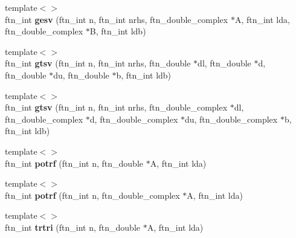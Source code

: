 \begin{DoxyCompactItemize}
\item 
\hypertarget{classsddk_1_1linalg_3_01_c_p_u_01_4_ab236040253d4ec5136b91ff0136cb5e0}{}{\footnotesize template$<$$>$ }\\ftn\+\_\+int {\bfseries gesv} (ftn\+\_\+int n, ftn\+\_\+int nrhs, ftn\+\_\+double\+\_\+complex $\ast$A, ftn\+\_\+int lda, ftn\+\_\+double\+\_\+complex $\ast$B, ftn\+\_\+int ldb)\label{classsddk_1_1linalg_3_01_c_p_u_01_4_ab236040253d4ec5136b91ff0136cb5e0}

\item 
\hypertarget{classsddk_1_1linalg_3_01_c_p_u_01_4_a7697a33f551389b3bca7d1939eb3e57a}{}{\footnotesize template$<$$>$ }\\ftn\+\_\+int {\bfseries gtsv} (ftn\+\_\+int n, ftn\+\_\+int nrhs, ftn\+\_\+double $\ast$dl, ftn\+\_\+double $\ast$d, ftn\+\_\+double $\ast$du, ftn\+\_\+double $\ast$b, ftn\+\_\+int ldb)\label{classsddk_1_1linalg_3_01_c_p_u_01_4_a7697a33f551389b3bca7d1939eb3e57a}

\item 
\hypertarget{classsddk_1_1linalg_3_01_c_p_u_01_4_a2227300a3adde5e0fcbc7c24643af540}{}{\footnotesize template$<$$>$ }\\ftn\+\_\+int {\bfseries gtsv} (ftn\+\_\+int n, ftn\+\_\+int nrhs, ftn\+\_\+double\+\_\+complex $\ast$dl, ftn\+\_\+double\+\_\+complex $\ast$d, ftn\+\_\+double\+\_\+complex $\ast$du, ftn\+\_\+double\+\_\+complex $\ast$b, ftn\+\_\+int ldb)\label{classsddk_1_1linalg_3_01_c_p_u_01_4_a2227300a3adde5e0fcbc7c24643af540}

\item 
\hypertarget{classsddk_1_1linalg_3_01_c_p_u_01_4_adf3058135e274482682f7b9b65417469}{}{\footnotesize template$<$$>$ }\\ftn\+\_\+int {\bfseries potrf} (ftn\+\_\+int n, ftn\+\_\+double $\ast$A, ftn\+\_\+int lda)\label{classsddk_1_1linalg_3_01_c_p_u_01_4_adf3058135e274482682f7b9b65417469}

\item 
\hypertarget{classsddk_1_1linalg_3_01_c_p_u_01_4_a9edb99f89d3360e7d5acc1652bb69634}{}{\footnotesize template$<$$>$ }\\ftn\+\_\+int {\bfseries potrf} (ftn\+\_\+int n, ftn\+\_\+double\+\_\+complex $\ast$A, ftn\+\_\+int lda)\label{classsddk_1_1linalg_3_01_c_p_u_01_4_a9edb99f89d3360e7d5acc1652bb69634}

\item 
\hypertarget{classsddk_1_1linalg_3_01_c_p_u_01_4_a8cba6523b3533167fd9707b3e3e919ed}{}{\footnotesize template$<$$>$ }\\ftn\+\_\+int {\bfseries trtri} (ftn\+\_\+int n, ftn\+\_\+double $\ast$A, ftn\+\_\+int lda)\label{classsddk_1_1linalg_3_01_c_p_u_01_4_a8cba6523b3533167fd9707b3e3e919ed}


\end{DoxyCompactItemize}
